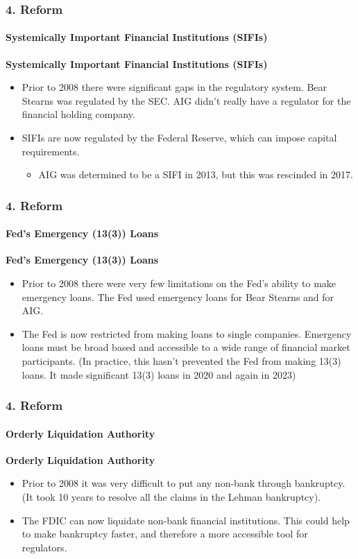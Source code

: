 \documentclass{beamer}
\begin{document}
\begin{frame}[t]
    \frametitle{4. Reform}
    \framesubtitle{Systemically Important Financial Institutions (SIFIs)}

    \textbf{Systemically Important Financial Institutions (SIFIs)}

    \begin{itemize}
        \item Prior to 2008 there were significant gaps in the regulatory system.   Bear Stearns was regulated by the SEC.   AIG didn’t really have a regulator for the financial holding company.
        \item SIFIs are now regulated by the Federal Reserve, which can impose capital requirements. 
        \begin{itemize} 
            \item AIG was determined to be a SIFI in 2013, but this was rescinded in 2017.
        \end{itemize}
    \end{itemize}

\end{frame}

\begin{frame}[t]
    \frametitle{4. Reform}
    \framesubtitle{Fed’s Emergency (13(3)) Loans}

    \textbf{Fed’s Emergency (13(3)) Loans}

    \begin{itemize}
        \item Prior to 2008 there were very few limitations on the Fed’s ability to make emergency loans.   The Fed used emergency loans for Bear Stearns and for AIG.
        \item The Fed is now restricted from making loans to single companies.   Emergency loans must be broad based and accessible to a wide range of financial market participants.  (In practice, this hasn't prevented the Fed from making 13(3) loans.  It made significant 13(3) loans in 2020 and again in 2023)
    \end{itemize}

\end{frame}

\begin{frame}[t]
    \frametitle{4. Reform}
    \framesubtitle{Orderly Liquidation Authority}

    \textbf{Orderly Liquidation Authority}

    \begin{itemize}
        \item Prior to 2008 it was very difficult to put any non-bank through bankruptcy.   (It took 10 years to resolve all the claims in the Lehman bankruptcy).
        \item The FDIC can now liquidate non-bank financial institutions.   This could help to make bankruptcy faster, and therefore a more accessible tool for regulators.
    \end{itemize}

\end{frame}
\end{document}
